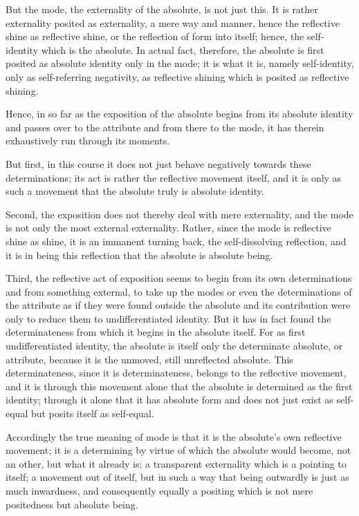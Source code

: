 But the mode, the externality of the absolute, is not just this.
It is rather externality posited as externality,
a mere way and manner,
hence the reflective shine as reflective shine,
or the reflection of form into itself;
hence, the self-identity which is the absolute.
In actual fact, therefore, the absolute is first posited
as absolute identity only in the mode;
it is what it is, namely self-identity,
only as self-referring negativity,
as reflective shining which is posited as reflective shining.

Hence, in so far as the exposition of the absolute
begins from its absolute identity
and passes over to the attribute
and from there to the mode,
it has therein exhaustively run through its moments.

But first, in this course it does not just behave
negatively towards these determinations;
its act is rather the reflective movement itself,
and it is only as such a movement that
the absolute truly is absolute identity.

Second, the exposition does not thereby deal with mere externality,
and the mode is not only the most external externality.
Rather, since the mode is reflective shine as shine,
it is an immanent turning back, the self-dissolving reflection,
and it is in being this reflection that the absolute is absolute being.

Third, the reflective act of exposition seems to begin
from its own determinations and from something external,
to take up the modes or even the determinations of the attribute
as if they were found outside the absolute
and its contribution were only to reduce them
to undifferentiated identity.
But it has in fact found the determinateness
from which it begins in the absolute itself.
For as first undifferentiated identity,
the absolute is itself only the determinate absolute,
or attribute, because it is the unmoved, still unreflected absolute.
This determinateness, since it is determinateness,
belongs to the reflective movement,
and it is through this movement alone
that the absolute is determined as the first identity;
through it alone that it has absolute form
and does not just exist as self-equal
but posits itself as self-equal.

Accordingly the true meaning of mode is that
it is the absolute's own reflective movement;
it is a determining by virtue of which
the absolute would become, not an other, but what it already is;
a transparent externality which is a pointing to itself;
a movement out of itself,
but in such a way that being outwardly is
just as much inwardness,
and consequently equally a positing
which is not mere positedness
but absolute being.

